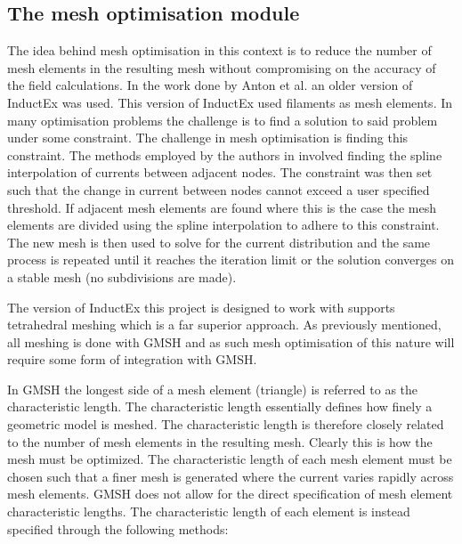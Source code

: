 \subsection{The mesh optimisation module}
\label{chap:meshopt}
The idea behind mesh optimisation in this context is to reduce the number of mesh elements in the resulting mesh without compromising on the accuracy of the field calculations. In the work done by Anton et al. \cite{fluxNoiseSquidsStevenAnton} an older version of InductEx was used. This version of InductEx used filaments as mesh elements. In many optimisation problems the challenge is to find a solution to said problem under some constraint. The challenge in mesh optimisation is finding this constraint. The methods employed by the authors in \cite{fluxNoiseSquidsStevenAnton} involved finding the spline interpolation of currents between adjacent nodes. The constraint was then set such that the change in current between nodes cannot exceed a user specified threshold. If adjacent mesh elements are found where this is the case the mesh elements are divided using the spline interpolation to adhere to this constraint. The new mesh is then used to solve for the current distribution and the same process is repeated until it reaches the iteration limit or the solution converges on a stable mesh (no subdivisions are made). \par
The version of InductEx this project is designed to work with supports tetrahedral meshing which is a far superior approach. As previously mentioned, all meshing is done with GMSH and as such mesh optimisation of this nature will require some form of integration with GMSH. \par
In GMSH the longest side of a mesh element (triangle) is referred to as the characteristic length. The characteristic length essentially defines how finely a geometric model is meshed. The characteristic length is therefore closely related to the number of mesh elements in the resulting mesh. Clearly this is how the mesh must be optimized. The characteristic length of each mesh element must be chosen such that a finer mesh is generated where the current varies rapidly across mesh elements. GMSH does not allow for the direct specification of mesh element characteristic lengths. The characteristic length of each element is instead specified through the following methods: 

